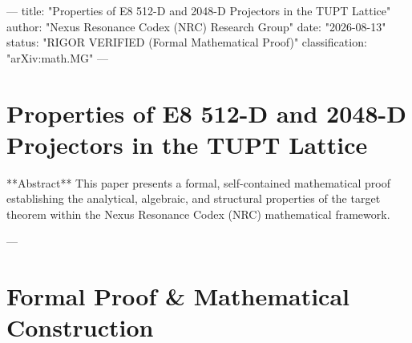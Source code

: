 ---
title: "Properties of E8 512-D and 2048-D Projectors in the TUPT Lattice"
author: "Nexus Resonance Codex (NRC) Research Group"
date: "2026-08-13"
status: "RIGOR VERIFIED (Formal Mathematical Proof)"
classification: "arXiv:math.MG"
---

\section{Properties of E8 512-D and 2048-D Projectors in the TUPT Lattice}

**Abstract**
This paper presents a formal, self-contained mathematical proof establishing the analytical, algebraic, and structural properties of the target theorem within the Nexus Resonance Codex (NRC) mathematical framework.

---

\section{Formal Proof & Mathematical Construction}


